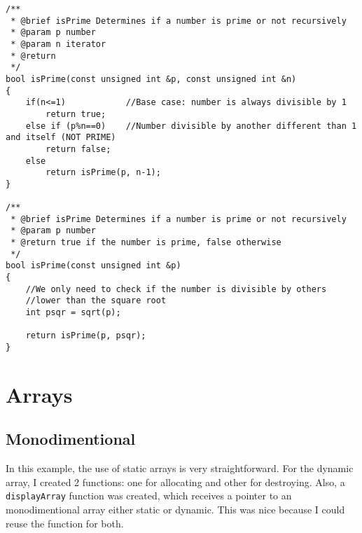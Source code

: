 \documentclass{article}
\begin{document}
\begin{lstlisting}[label=lst_rec,caption=isPrime]
/**
 * @brief isPrime Determines if a number is prime or not recursively
 * @param p number
 * @param n iterator
 * @return
 */
bool isPrime(const unsigned int &p, const unsigned int &n)
{
	if(n<=1)            //Base case: number is always divisible by 1
		return true;
	else if (p%n==0)    //Number divisible by another different than 1 and itself (NOT PRIME)
		return false;
	else
		return isPrime(p, n-1);
}

/**
 * @brief isPrime Determines if a number is prime or not recursively
 * @param p number
 * @return true if the number is prime, false otherwise
 */
bool isPrime(const unsigned int &p)
{
	//We only need to check if the number is divisible by others
	//lower than the square root
	int psqr = sqrt(p);

	return isPrime(p, psqr);
}

\end{lstlisting} 


\section{Arrays}
\subsection{Monodimentional}
In this example, the use of static arrays is very straightforward.
For the dynamic array, I created 2 functions: one for allocating and other for destroying.
Also, a \verb+displayArray+ function was created, which receives a pointer 
to an monodimentional array either
static or dynamic. This was nice because I could reuse the function
for both.
\end{document}
